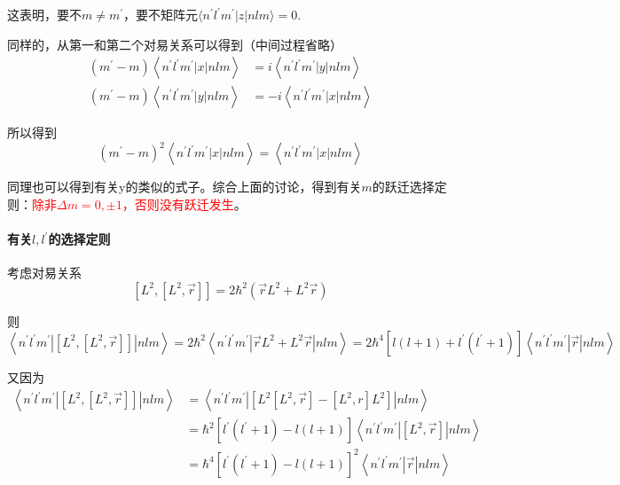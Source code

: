 \documentclass[UTF8]{ctexart}
\newcommand{\red}{\textcolor{red}}
\begin{document}
\noindent 这表明，要不$m \ne m^{\prime}$，要不矩阵元$\langle n ^{\prime} l ^{\prime} m^{\prime} | z|nlm \rangle =0$.

    同样的，从第一和第二个对易关系可以得到（中间过程省略）
    \begin{equation}
        \begin{aligned}
            \left(m^{\prime}-m\right)\left\langle n^{\prime} l^{\prime} m^{\prime}|x| n l m\right\rangle&= i\left\langle n^{\prime} l^{\prime} m^{\prime}|y| n l m\right\rangle \\
            \left(m^{\prime}-m\right)\left\langle n^{\prime} l^{\prime} m^{\prime}|y| n l m\right\rangle&= -i\left\langle n^{\prime} l^{\prime} m^{\prime}|x| n l m\right\rangle
        \end{aligned}
    \end{equation}

\noindent 所以得到 
\begin{equation}
    (m^{\prime} - m)^2 \left\langle n^{\prime} l^{\prime} m^{\prime}|x| n l m\right\rangle = \left\langle n^{\prime} l^{\prime} m^{\prime}|x| n l m\right\rangle
\end{equation}

\noindent 同理也可以得到有关y的类似的式子。综合上面的讨论，得到有关$m$的跃迁选择定则：\red{除非$\Delta m = 0 , \pm 1$，否则没有跃迁发生}。

    \paragraph{有关\texorpdfstring{$l,l^{\prime}$}{Lg}的选择定则}
    考虑对易关系 
    \begin{equation}
        \left[L^2,\left[L^2,\vec{r}\right]\right] = 2 \hbar^2 (\vec{r}L^2 + L^2 \vec{r})
    \end{equation}

\noindent 则
\begin{equation}
    \left\langle n^{\prime} l^{\prime} m^{\prime}|\left[L^2,\left[L^2,\vec{r}\right]\right]| n l m\right\rangle= 2 \hbar^2 \left\langle n^{\prime} l^{\prime} m^{\prime}|\vec{r}L^2 + L^2 \vec{r}| n l m\right\rangle = 2 \hbar^4 \left[l(l+1) + l^{\prime}(l^{\prime}+1) \right]\left\langle n^{\prime} l^{\prime} m^{\prime}|\vec{r}| n l m\right\rangle
\end{equation}

\noindent 又因为
\begin{equation}
    \begin{aligned}
        \left\langle n^{\prime} l^{\prime} m^{\prime}|\left[L^2,\left[L^2,\vec{r}\right]\right]| n l m\right\rangle &= \left\langle n^{\prime} l^{\prime} m^{\prime}|\left[L^2\left[L^2,\vec{r}\right] - \left[L^2,r\right]L^2\right]| n l m\right\rangle \\
        &= \hbar^2 \left[l^{\prime}(l^{\prime}+1) - l(l+1)\right]\left\langle n^{\prime} l^{\prime} m^{\prime}|\left[L^2,\vec{r}\right]| n l m\right\rangle \\
        &=\hbar^4 \left[l^{\prime}(l^{\prime}+1) - l(l+1)\right]^2 \left\langle n^{\prime} l^{\prime} m^{\prime}|\vec{r}| n l m\right\rangle
    \end{aligned}
\end{equation}
\end{document}
